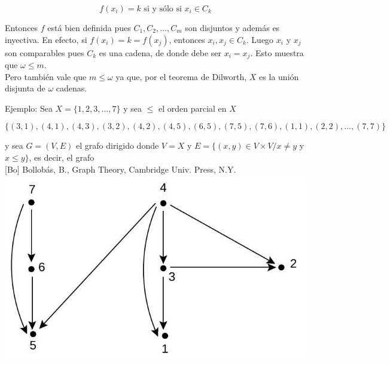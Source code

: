 \documentclass[10pt]{article}
\begin{document}
$$
f\left(x_{i}\right)=k \text { si y sólo si } x_{i} \in C_{k}
$$

Entonces $f$ está bien definida pues $C_{1}, C_{2}, \ldots, C_{m}$ son disjuntos y además es inyectiva. En efecto, si $f\left(x_{i}\right)=k=f\left(x_{j}\right)$, entonces $x_{i}, x_{j} \in C_{k}$. Luego $x_{i}$ y $x_{j}$ son comparables pues $C_{k}$ es una cadena, de donde debe ser $x_{i}=x_{j}$. Esto muestra que $\omega \leq m$.\\
Pero también vale que $m \leq \omega$ ya que, por el teorema de Dilworth, $X$ es la unión disjunta de $\omega$ cadenas.

Ejemplo: Sea $X=\{1,2,3, \ldots, 7\}$ y sea $\leq$ el orden parcial en $X$

$$
\{(3,1),(4,1),(4,3),(3,2),(4,2),(4,5),(6,5),(7,5),(7,6),(1,1),(2,2), \ldots,(7,7)\}
$$

y sea $G=(V, E)$ el grafo dirigido donde $V=X$ y $E=\{(x, y) \in V \times V / x \neq y$ y $x \leq y\}$, es decir, el grafo\\[0pt]
[Bo] Bollobás, B., Graph Theory, Cambridge Univ. Press, N.Y.\\
\includegraphics[max width=\textwidth, center]{2025_09_05_b69e29efaf9a6d2aa81ag-13}
\end{document}
